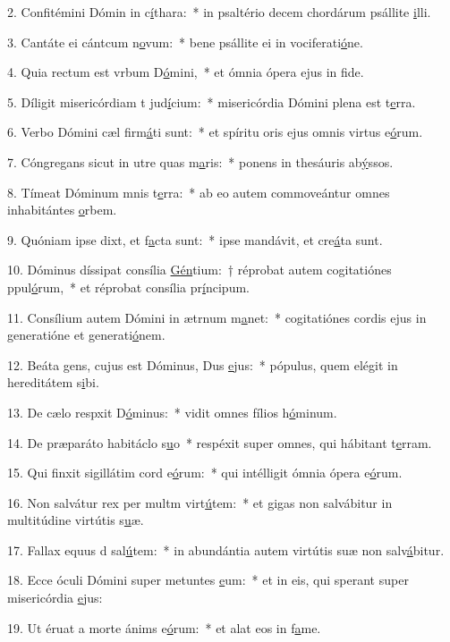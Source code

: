 2. Confitémini Dómin in c\uline{í}thara:~* in psaltério decem chordárum psállite \uline{i}lli.\par 
3. Cantáte ei cántcum n\uline{o}vum:~* bene psállite ei in vociferati\uline{ó}ne.\par 
4. Quia rectum est vrbum D\uline{ó}mini,~* et ómnia ópera ejus in f\uline{i}de.\par 
5. Díligit misericórdiam t jud\uline{í}cium:~* misericórdia Dómini plena est t\uline{e}rra.\par 
6. Verbo Dómini cæl firm\uline{á}ti sunt:~* et spíritu oris ejus omnis virtus e\uline{ó}rum.\par 
7. Cóngregans sicut in utre quas m\uline{a}ris:~* ponens in thesáuris ab\uline{ý}ssos.\par 
8. Tímeat Dóminum mnis t\uline{e}rra:~* ab eo autem commoveántur omnes inhabitántes \uline{o}rbem.\par 
9. Quóniam ipse dixt, et f\uline{a}cta sunt:~* ipse mandávit, et cre\uline{á}ta sunt.\par 
10. Dóminus díssipat consília \uline{Gén}tium:~† réprobat autem cogitatiónes ppul\uline{ó}rum,~* et réprobat consília pr\uline{í}ncipum.\par 
11. Consílium autem Dómini in ætrnum m\uline{a}net:~* cogitatiónes cordis ejus in generatióne et generati\uline{ó}nem.\par 
12. Beáta gens, cujus est Dóminus, Dus \uline{e}jus:~* pópulus, quem elégit in hereditátem s\uline{i}bi.\par 
13. De cælo respxit D\uline{ó}minus:~* vidit omnes fílios h\uline{ó}minum.\par 
14. De præparáto habitáclo s\uline{u}o~* respéxit super omnes, qui hábitant t\uline{e}rram.\par 
15. Qui finxit sigillátim cord e\uline{ó}rum:~* qui intélligit ómnia ópera e\uline{ó}rum.\par 
16. Non salvátur rex per multm virt\uline{ú}tem:~* et gigas non salvábitur in multitúdine virtútis s\uline{u}æ.\par 
17. Fallax equus d sal\uline{ú}tem:~* in abundántia autem virtútis suæ non salv\uline{á}bitur.\par 
18. Ecce óculi Dómini super metuntes \uline{e}um:~* et in eis, qui sperant super misericórdia \uline{e}jus:\par 
19. Ut éruat a morte ánims e\uline{ó}rum:~* et alat eos in f\uline{a}me.\par 
